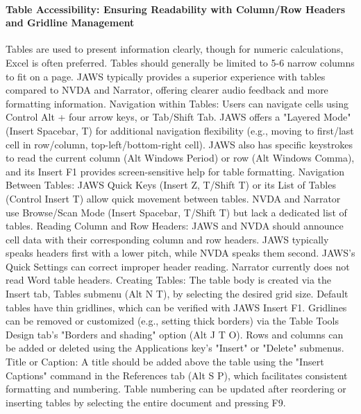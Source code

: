 \paragraph{Table Accessibility: Ensuring Readability with Column/Row Headers and Gridline Management}
Tables are used to present information clearly, though for numeric calculations, Excel is often preferred.\supercite{kingsbury2025} Tables should generally be limited to 5-6 narrow columns to fit on a page.\supercite{kingsbury2025} JAWS typically provides a superior experience with tables compared to NVDA and Narrator, offering clearer audio feedback and more formatting information.\supercite{kingsbury2025}
Navigation within Tables: Users can navigate cells using Control Alt + four arrow keys, or Tab/Shift Tab.\supercite{kingsbury2025} JAWS offers a "Layered Mode" (Insert Spacebar, T) for additional navigation flexibility (e.g., moving to first/last cell in row/column, top-left/bottom-right cell).\supercite{kingsbury2025} JAWS also has specific keystrokes to read the current column (Alt Windows Period) or row (Alt Windows Comma), and its Insert F1 provides screen-sensitive help for table formatting.\supercite{kingsbury2025}
Navigation Between Tables: JAWS Quick Keys (Insert Z, T/Shift T) or its List of Tables (Control Insert T) allow quick movement between tables.\supercite{kingsbury2025} NVDA and Narrator use Browse/Scan Mode (Insert Spacebar, T/Shift T) but lack a dedicated list of tables.\supercite{kingsbury2025}
Reading Column and Row Headers: JAWS and NVDA should announce cell data with their corresponding column and row headers. JAWS typically speaks headers first with a lower pitch, while NVDA speaks them second.\supercite{kingsbury2025} JAWS's Quick Settings can correct improper header reading.\supercite{kingsbury2025} Narrator currently does not read Word table headers.\supercite{kingsbury2025}
Creating Tables: The table body is created via the Insert tab, Tables submenu (Alt N T), by selecting the desired grid size.\supercite{kingsbury2025} Default tables have thin gridlines, which can be verified with JAWS Insert F1.\supercite{kingsbury2025} Gridlines can be removed or customized (e.g., setting thick borders) via the Table Tools Design tab's "Borders and shading" option (Alt J T O).\supercite{kingsbury2025} Rows and columns can be added or deleted using the Applications key's "Insert" or "Delete" submenus.\supercite{kingsbury2025}
Title or Caption: A title should be added above the table using the "Insert Captions" command in the References tab (Alt S P), which facilitates consistent formatting and numbering.\supercite{kingsbury2025} Table numbering can be updated after reordering or inserting tables by selecting the entire document and pressing F9.\supercite{kingsbury2025}
